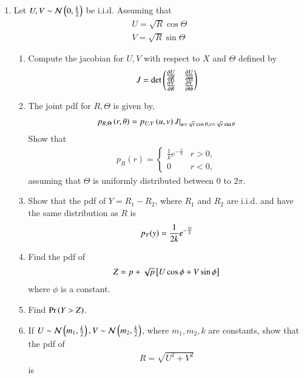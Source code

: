 \documentclass[journal,12pt,twocolumn]{IEEEtran}
\renewcommand\thesection{\arabic{section}}
\begin{document}
\begin{enumerate}[label=\thesection.\arabic*
,ref=\thesection.\theenumi]
\item
 Let $U,V\sim\mathcal{N}\left(0,\frac{k}{2}\right)$ be i.i.d.  Assuming that
%
\begin{align}
U = \sqrt{R} \cos \Theta \\
V = \sqrt{R} \sin \Theta
\end{align}
\begin{enumerate}
\item 
Compute the jacobian for $U,V$ with respect to $X$ and $\Theta$ defined by
%
\begin{align}
J = \det\left(
\begin{matrix}
\frac{\partial U}{\partial R} & \frac{\partial U}{\partial \Theta} \\
\frac{\partial V}{\partial R} & \frac{\partial V}{\partial \Theta}
\end{matrix}
\right)
\end{align}
\item 
The joint pdf for $R,\Theta$ is given by,
%
\begin{align}
p_{R,\Theta}\left(r,\theta\right) = p_{U,V}\left(u,v\right)J\vert_{u = \sqrt{r}\cos\theta,v = \sqrt{r}\sin\theta}
\end{align}
%
Show that
%
\begin{align}
p_{R}(r) = 
\begin{cases}
\frac{1}{k}e^{-\frac{r}{k}} & r > 0, \\
0 & r < 0,
\end{cases}
\end{align}
%
assuming that $\Theta$ is uniformly distributed between 0 to $2\pi$.
\item
Show that the pdf of $Y = R_1-R_2$, where $R_1$ and $R_2$ are i.i.d. and have the same distribution as $R$ is
%
\begin{align}
p_{Y}(y) = \frac{1}{2k}e^{-\frac{\left\vert y\right\vert}{k}}
\end{align}
%
\item 
 Find the pdf of 
%
\begin{align}
Z = p + \sqrt{p}{}\left[U \cos \phi + V \sin \phi\right]
\end{align}
%
where $\phi$ is a constant.
\item 
Find $\Pr\left(Y > Z\right)$.
\item 
If $U\sim\mathcal{N}\left(m_1,\frac{k}{2}\right),V\sim\mathcal{N}\left(m_2,\frac{k}{2}\right)$, where $m_1,m_2, k$ are constants, show that the pdf of 
%
\begin{align}
R = \sqrt{U^2+V^2}
\end{align}
%
is
%
\begin{align}

\end{align}
\end{enumerate}
\end{enumerate}
\end{document}
